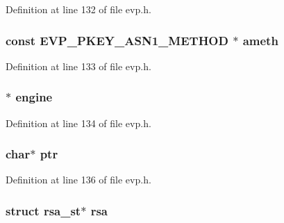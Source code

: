 Definition at line 132 of file evp.\+h.

\subsubsection[{\texorpdfstring{ameth}{ameth}}]{\setlength{\rightskip}{0pt plus 5cm}const {\bf E\+V\+P\+\_\+\+P\+K\+E\+Y\+\_\+\+A\+S\+N1\+\_\+\+M\+E\+T\+H\+OD} $\ast$ ameth}\hypertarget{structevp__pkey__st_a7fe088e482353854cce1b5769417f1ce}{}\label{structevp__pkey__st_a7fe088e482353854cce1b5769417f1ce}


Definition at line 133 of file evp.\+h.

\subsubsection[{\texorpdfstring{engine}{engine}}]{ $\ast$ engine}\hypertarget{structevp__pkey__st_ae4bca26806adfdaf8a28463c98ddf03a}{}\label{structevp__pkey__st_ae4bca26806adfdaf8a28463c98ddf03a}


Definition at line 134 of file evp.\+h.

\subsubsection[{\texorpdfstring{ptr}{ptr}}]{\setlength{\rightskip}{0pt plus 5cm}char$\ast$ ptr}\hypertarget{structevp__pkey__st_a935adc2e417a61d7eb6f04efb18ba031}{}\label{structevp__pkey__st_a935adc2e417a61d7eb6f04efb18ba031}


Definition at line 136 of file evp.\+h.

\subsubsection[{\texorpdfstring{rsa}{rsa}}]{\setlength{\rightskip}{0pt plus 5cm}struct {\bf rsa\+\_\+st}$\ast$ rsa}\hypertarget{structevp__pkey__st_a7c43c4831c51c5171f307a37e3048fe7}{}\label{structevp__pkey__st_a7c43c4831c51c5171f307a37e3048fe7}


